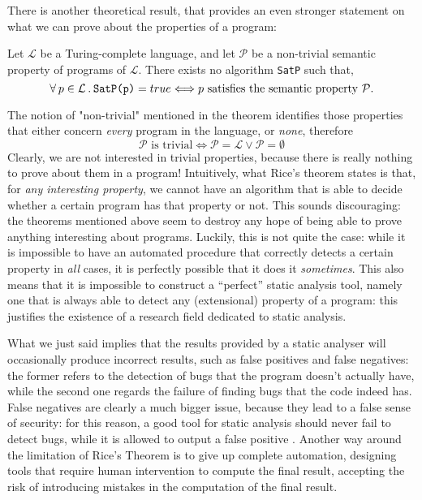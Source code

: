 \documentclass[target=mst,aauheader=aics]{thud}
\newcommand{\st}{\hspace{2px}.\hspace{2px}}
\theoremstyle{definition}
\begin{document}
	There is another theoretical result, that provides an even stronger statement on what we can prove about the properties of a program:
	\begin{thm} Let $\mathcal{L}$ be a Turing-complete language, and let $\mathcal{P}$ be a non-trivial semantic property of programs of $\mathcal{L}$. There exists no algorithm \texttt{SatP} such that,
		\[
		\forall\hspace{2px}p\in\mathcal{L}\st\texttt{SatP(p)} = true \Longleftrightarrow p\text{ satisfies the semantic property } \mathcal{P}. 	
		\]
	\end{thm}
	The notion of "non-trivial" mentioned in the theorem identifies those properties that either concern \textit{every} program in the language, or \textit{none}, therefore
	\[
	\mathcal{P}\text{ is trivial} \Longleftrightarrow \mathcal{P} = \mathcal{L} \vee \mathcal{P} = \emptyset
	\]
	Clearly, we are not interested in trivial properties, because there is really nothing to prove about them in a program!
	Intuitively, what Rice's theorem states is that, for \textit{any interesting property}, we cannot have an algorithm that is able to decide whether a certain program has that property or not. This sounds discouraging: the theorems mentioned above seem to destroy any hope of being able to prove anything interesting about programs. Luckily, this is not quite the case: while it is impossible to have an automated procedure that correctly detects a certain property in \textit{all} cases, it is perfectly possible that it does it \textit{sometimes}. This also means that it is impossible to construct a ``perfect'' static analysis tool, namely one that is always able to detect any (extensional) property of a program: this justifies the existence of a research field dedicated to static analysis.
	
	What we just said implies that the results provided by a static analyser will occasionally produce incorrect results, such as false positives and false negatives: the former refers to the detection of bugs that the program doesn't actually have, while the second one regards the failure of finding bugs that the code indeed has. False negatives are clearly a much bigger issue, because they lead to a false sense of security: for this reason, a good tool for static analysis should never fail to detect bugs, while it is allowed to output a false positive \cite{Gomes2009}. Another way around the limitation of Rice's Theorem is to give up complete automation, designing tools that require human intervention to compute the final result, accepting the risk of introducing mistakes in the computation of the final result.
	
\end{document}

